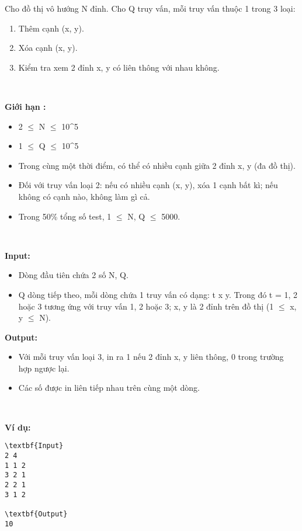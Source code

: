 

Cho đồ thị vô hướng N đỉnh. Cho Q truy vấn, mỗi truy vấn thuộc 1 trong 3 loại:
\begin{enumerate}
	\item Thêm cạnh (x, y).
	\item Xóa cạnh (x, y).
	\item Kiểm tra xem 2 đỉnh x, y có liên thông với nhau không.
\end{enumerate}

 

\textbf{Giới hạn : }
\begin{itemize}
	\item 2  $\le$  N  $\le$  10^5
	\item 1  $\le$  Q  $\le$  10^5
	\item Trong cùng một thời điểm, có thể có nhiều cạnh giữa 2 đỉnh x, y (đa đồ thị).
	\item Đối với truy vấn loại 2: nếu có nhiều cạnh (x, y), xóa 1 cạnh bất kì; nếu không có cạnh nào, không làm gì cả.
	\item Trong 50\% tổng số test, 1  $\le$  N, Q  $\le$  5000.
\end{itemize}

 

\textbf{Input: }
\begin{itemize}
	\item Dòng đầu tiên chứa 2 số N, Q.
	\item Q dòng tiếp theo, mỗi dòng chứa 1 truy vấn có dạng: t x y. Trong đó t = 1, 2 hoặc 3 tương ứng với truy vấn 1, 2 hoặc 3; x, y là 2 đỉnh trên đồ thị (1  $\le$  x, y  $\le$  N).
\end{itemize}

\textbf{Output: }
\begin{itemize}
	\item Với mỗi truy vấn loại 3, in ra 1 nếu 2 đỉnh x, y liên thông, 0 trong trường hợp ngược lại.
	\item Các số được in liên tiếp nhau trên cùng một dòng.
\end{itemize}

 

\textbf{Ví dụ: }
\begin{verbatim}
\textbf{Input}
2 4
1 1 2
3 2 1
2 2 1
3 1 2

\textbf{Output}
10


\end{verbatim}
